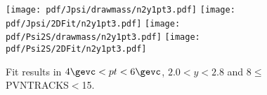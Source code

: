 \begin{figure}[H]
\begin{center}
\texttt{[image: pdf/Jpsi/drawmass/n2y1pt3.pdf]}
\texttt{[image: pdf/Jpsi/2DFit/n2y1pt3.pdf]}
\vspace*{-0.5cm}
\texttt{[image: pdf/Psi2S/drawmass/n2y1pt3.pdf]}
\texttt{[image: pdf/Psi2S/2DFit/n2y1pt3.pdf]}
\vspace*{-0.5cm}
\end{center}
\caption{Fit results in $4\gevc<pt<6\gevc$, $2.0<y<2.8$ and 8$\leq$PVNTRACKS$<$15.}
\label{Fitn2y1pt3}
\end{figure}
